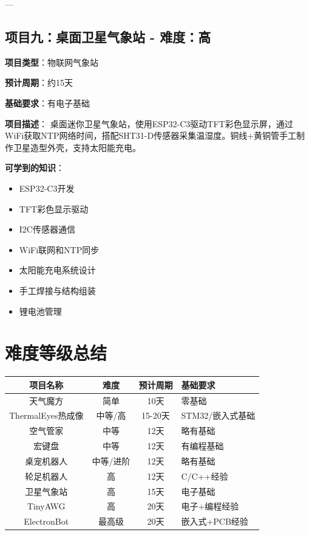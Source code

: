 \documentclass[12pt,a4paper]{article}
\begin{document}
---

\subsection{项目九：桌面卫星气象站 - 难度：高}

\textbf{项目类型}：物联网气象站

\textbf{预计周期}：约15天

\textbf{基础要求}：有电子基础

\textbf{项目描述}：
桌面迷你卫星气象站，使用ESP32-C3驱动TFT彩色显示屏，通过WiFi获取NTP网络时间，搭配SHT31-D传感器采集温湿度。铜线+黄铜管手工制作卫星造型外壳，支持太阳能充电。

\textbf{可学到的知识}：
\begin{itemize}
    \item ESP32-C3开发
    \item TFT彩色显示驱动
    \item I2C传感器通信
    \item WiFi联网和NTP同步
    \item 太阳能充电系统设计
    \item 手工焊接与结构组装
    \item 锂电池管理
\end{itemize}

\newpage

\section{难度等级总结}

\begin{table}[h]
\centering
\begin{tabular}{|c|c|c|l|}
\hline
项目名称 & 难度 & 预计周期 & 基础要求 \\
\hline
天气魔方 & 简单 & 10天 & 零基础 \\
\hline
ThermalEyes热成像 & 中等/高 & 15-20天 & STM32/嵌入式基础 \\
\hline
空气管家 & 中等 & 12天 & 略有基础 \\
\hline
宏键盘 & 中等 & 12天 & 有编程基础 \\
\hline
桌宠机器人 & 中等/进阶 & 12天 & 略有基础 \\
\hline
轮足机器人 & 高 & 12天 & C/C++经验 \\
\hline
卫星气象站 & 高 & 15天 & 电子基础 \\
\hline
TinyAWG & 高 & 20天 & 电子+编程经验 \\
\hline
ElectronBot & 最高级 & 20天 & 嵌入式+PCB经验 \\
\hline
\end{tabular}
\end{table}
\end{document}
